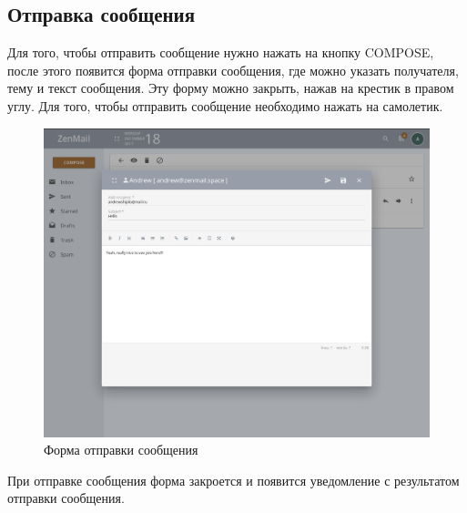 \documentclass{article}
\begin{document}
\subsection{Отправка сообщения}
Для того, чтобы отправить сообщение нужно нажать на кнопку COMPOSE, после этого появится форма отправки сообщения, где можно указать получателя, тему и текст сообщения. Эту форму можно закрыть, нажав на крестик в правом углу. Для того, чтобы отправить сообщение необходимо нажать на самолетик.

\begin{figure}[H]
        \begin{flushleft}        \centerline{\includegraphics[scale=0.6]{sendmessage.png}}
        \caption{Форма отправки сообщения}
        \end{flushleft}
\end{figure}

При отправке сообщения форма закроется и появится уведомление с результатом отправки сообщения.
\end{document}
